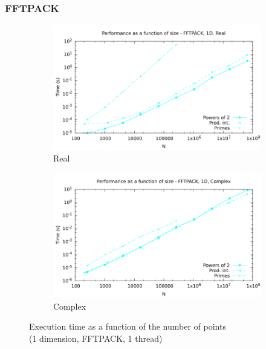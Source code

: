 \documentclass[12pt, a4paper]{article}
\begin{document}
\subsubsection{FFTPACK}
\begin{figure}[H]
\captionsetup{width=0.8\linewidth}
\centering
\begin{subfigure}{.5\textwidth}
\centering
\includegraphics[width=.9\linewidth]{graphs/performance/1d-fftpack-r.pdf}
\caption{Real}
\label{1DFFTPACKR}
\end{subfigure}%
\begin{subfigure}{.5\textwidth}
\centering
\includegraphics[width=.9\linewidth]{graphs/performance/1d-fftpack-c.pdf}
\caption{Complex}
\label{1DFFTPACKC}
\end{subfigure}
\caption{Execution time as a function of the number of points\\(1 dimension, FFTPACK, 1 thread)}
\label{1DFFTPACK}
\end{figure}
\end{document}
